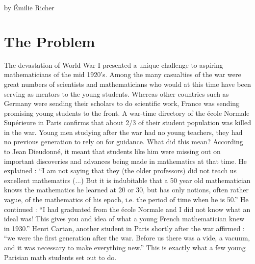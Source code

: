 \documentclass[12pt]{article}
\begin{document}
\small by \'Emilie Richer\\\normalsize
\section*{The Problem}\normalsize

The devastation of World War I presented a unique challenge to aspiring
mathematicians of the mid 1920's. Among the many casualties of the war 
were great numbers of scientists and mathematicians who would at this 
time have been serving as mentors to the young students. Whereas other 
countries such as Germany were sending their scholars to do scientific 
work, France was sending promising young students to the front. A war-time 
directory of the \'ecole Normale Sup\'erieure in Paris confirms that about 
2/3 of their student population was killed in the war.\cite{DJ} Young men 
studying after the war had no young teachers, they had no previous 
generation to rely on for guidance. What did this mean? According to Jean 
Dieudonn\'e, it meant that students like him were missing out on important 
discoveries and advances being made in mathematics at that time. He 
explained : ``I am not saying that they (the older professors) did not 
teach us excellent mathematics (...) But it is indubitable that a 50 year 
old mathematician knows the mathematics he learned at 20 or 30, but has 
only notions, often rather vague, of the mathematics of his epoch, i.e. 
the period of time when he is 50.'' He continued : ``I had graduated from 
the \'ecole Normale and I did not know what an ideal was! This gives you 
and idea of what a young French mathematician knew in 1930.''\cite{DJ} 
Henri Cartan, another student in Paris shortly after the war affirmed : 
``we were the first generation after the war. Before us there was a vide, 
a vacuum, and it was necessary to make everything new.''\cite{JA} This is 
exactly what a few young Parisian math students set out to do.\\
\end{document}
